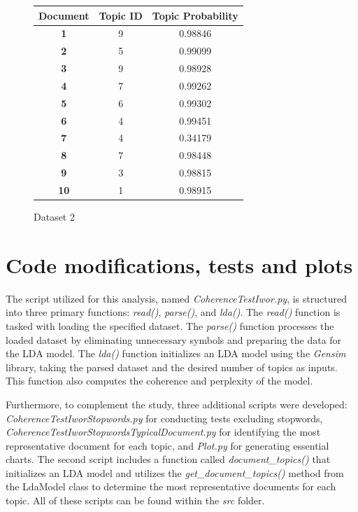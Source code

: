 \documentclass[10pt]{article} %
\begin{document}
\begin{figure}[H]
	\centering
	\begin{tabular}{|c|c|c|}
		\hline \textbf{Document} & \textbf{Topic ID} & \textbf{Topic Probability}  \\  
		\hline \textbf{1} & 9 & 0.98846 \\
		\hline \textbf{2} & 5 & 0.99099\\
		\hline \textbf{3} & 9 & 0.98928 \\
		\hline \textbf{4} & 7 & 0.99262 \\
		\hline \textbf{5} & 6 & 0.99302 \\
		\hline \textbf{6} & 4  & 0.99451 \\
		\hline \textbf{7} & 4 & 0.34179 \\
		\hline \textbf{8} & 7 & 0.98448 \\
		\hline \textbf{9} & 3 & 0.98815 \\
		\hline \textbf{10} & 1 & 0.98915 \\
		\hline
	\end{tabular}
	\caption{Dataset 2}
\end{figure}

\section{Code modifications, tests and plots}

The script utilized for this analysis, named \textit{CoherenceTestIwor.py}, is structured into three primary functions: \textit{read()}, \textit{parse()}, and \textit{lda()}. The \textit{read()} function is tasked with loading the specified dataset. The \textit{parse()} function processes the loaded dataset by eliminating unnecessary symbols and preparing the data for the LDA model. The \textit{lda()} function initializes an LDA model using the \textit{Gensim} library, taking the parsed dataset and the desired number of topics as inputs. This function also computes the coherence and perplexity of the model.

Furthermore, to complement the study, three additional scripts were developed: \textit{CoherenceTestIworStopwords.py} for conducting tests excluding stopwords, \textit{CoherenceTestIworStopwordsTypicalDocument.py} for identifying the most representative document for each topic, and \textit{Plot.py} for generating essential charts. The second script includes a function called \textit{document\_topics()} that initializes an LDA model and utilizes the \textit{get\_document\_topics()} method from the LdaModel class to determine the most representative documents for each topic. All of these scripts can be found within the \textit{src} folder.
\end{document}
